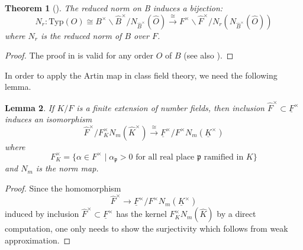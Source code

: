 \documentclass[12pt]{article}
\theoremstyle{plain}
\newtheorem{theorem}{Theorem}[section]
\newtheorem{lemma}[theorem]{Lemma}
\theoremstyle{definition}
\theoremstyle{remark}
\begin{document}
\begin{theorem}[{\cite[Theorem 3.1]{Linowitz2012}}]\label{NR}
The reduced norm on B induces a bijection:
$$N_r:\mathrm{Typ} (O)\cong B^\times\backslash\widehat{B}^\times/N_{\widehat{B}^\times}(\widehat{O})\xrightarrow{\cong} F^\times\backslash \widehat{F}^\times/N_r(N_{\widehat{B}^\times}(\widehat{O}))$$ where $N_r$ is the reduced norm of $B$ over $F$.
\end{theorem}
\begin{proof} The proof in \cite[Theorem 3.1]{Linowitz2012} is valid for any order $O$ of $B$ (see also \cite[Proposition 2.7]{xie2025integralembeddingscentralsimple}).
\end{proof}

In order to apply the Artin map in class field theory, we need the following lemma.

\begin{lemma}\label{ext}
If $K/F$ is a finite extension of number fields, then inclusion $\widehat{F}^\times \subset\underline{F}^\times$ induces an isomorphism $$\widehat{F}^\times/F^\times_{K} N_m(\widehat{K}^\times)\xrightarrow{\cong} \underline{F}^\times/F^\times N_m(\underline{K}^\times)$$
where $$F^\times_{K} =\{\alpha \in F^\times\mid  \alpha_\mathfrak{p}>0 \text{ for all real place } \mathfrak{p} \text{ ramified in }K\}$$ and $N_m$ is the norm map.
\end{lemma}

\begin{proof} Since the homomorphism
$$ \widehat{F}^\times\longrightarrow \underline{F}^\times/F^\times N_m(\underline{K}^\times)$$ induced by inclusion $\widehat{F}^\times \subset\underline{F}^\times$ has the kernel $F^\times_{K} N_m(\widehat{K})$ by a direct computation, one only needs to show the surjectivity which follows from weak approximation.
\end{proof}
\end{document}
